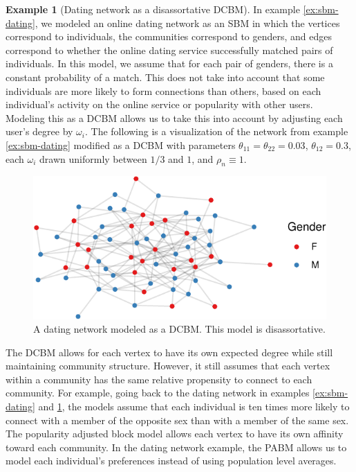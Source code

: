 \documentclass[
  11pt,
]{article}
\theoremstyle{definition}
\theoremstyle{definition}
\newtheorem{example}{Example}[section]
\theoremstyle{definition}
\theoremstyle{definition}
\theoremstyle{remark}
\begin{document}
\begin{example}[Dating network as a disassortative DCBM]
\label{ex:dcbm-dating}
In example \ref{ex:sbm-dating}, we modeled an online dating network as an SBM in which the vertices correspond to individuals, the communities correspond to genders, and edges correspond to whether the online dating service successfully matched pairs of individuals. 
In this model, we assume that for each pair of genders, there is a constant probability of a match. 
This does not take into account that some individuals are more likely to form connections than others, based on each individual's activity on the online service or popularity with other users. 
Modeling this as a DCBM allows us to take this into account by adjusting each user's degree by $\omega_i$. 
The following is a visualization of the network from example \ref{ex:sbm-dating} modified as a DCBM with parameters $\theta_{11} = \theta_{22} = 0.03$, $\theta_{12} = 0.3$, each $\omega_i$ drawn uniformly between $1/3$ and $1$, and $\rho_n \equiv 1$. 

\begin{figure}[H]

{\centering \includegraphics{draft_files/figure-latex/dating-dcbm-1} 

}

\caption{A dating network modeled as a DCBM. This model is disassortative.}\label{fig:dating-dcbm}
\end{figure}
\end{example}

The DCBM allows for each vertex to have its own expected degree while still maintaining community structure.
However, it still assumes that each vertex within a community has the same relative propensity to connect to each community.
For example, going back to the dating network in examples \ref{ex:sbm-dating} and \ref{ex:dcbm-dating}, the models assume that each individual is ten times more likely to connect with a member of the opposite sex than with a member of the same sex.
The popularity adjusted block model \citep{307cbeb9b1be48299388437423d94bf1} allows each vertex to have its own affinity toward each community.
In the dating network example, the PABM allows us to model each individual's preferences instead of using population level averages.
\end{document}
